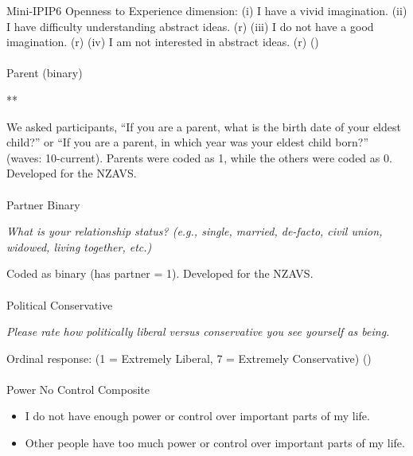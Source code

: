 \documentclass[
  single column]{article}
\makeatletter
\let\oldparagraph\paragraph
\renewcommand{\paragraph}{
    \@ifstar
      \xxxParagraphStar
      \xxxParagraphNoStar
  }
\newcommand{\xxxParagraphStar}[1]{\oldparagraph*{#1}\mbox{}}
\newcommand{\xxxParagraphNoStar}[1]{\oldparagraph{#1}\mbox{}}
\providecommand{\tightlist}{%
  \setlength{\itemsep}{0pt}\setlength{\parskip}{0pt}}\usepackage{longtable,booktabs,array}
\makeatother
\begin{document}
Mini-IPIP6 Openness to Experience dimension: (i) I have a vivid
imagination. (ii) I have difficulty understanding abstract ideas. (r)
(iii) I do not have a good imagination. (r) (iv) I am not interested in
abstract ideas. (r) ()

\paragraph{Parent (binary)}\label{parent-binary}

**

We asked participants, ``If you are a parent, what is the birth date of
your eldest child?'' or ``If you are a parent, in which year was your
eldest child born?'' (waves: 10-current). Parents were coded as 1, while
the others were coded as 0. Developed for the NZAVS.

\paragraph{Partner Binary}\label{partner-binary}

\emph{What is your relationship status? (e.g., single, married,
de-facto, civil union, widowed, living together, etc.)}

Coded as binary (has partner = 1). Developed for the NZAVS.

\paragraph{Political Conservative}\label{political-conservative}

\emph{Please rate how politically liberal versus conservative you see
yourself as being.}

Ordinal response: (1 = Extremely Liberal, 7 = Extremely Conservative)
()

\paragraph{Power No Control Composite}\label{power-no-control-composite}

\begin{itemize}
\tightlist
\item
  I do not have enough power or control over important parts of my life.
\item
  Other people have too much power or control over important parts of my
  life.
\end{itemize}
\end{document}
